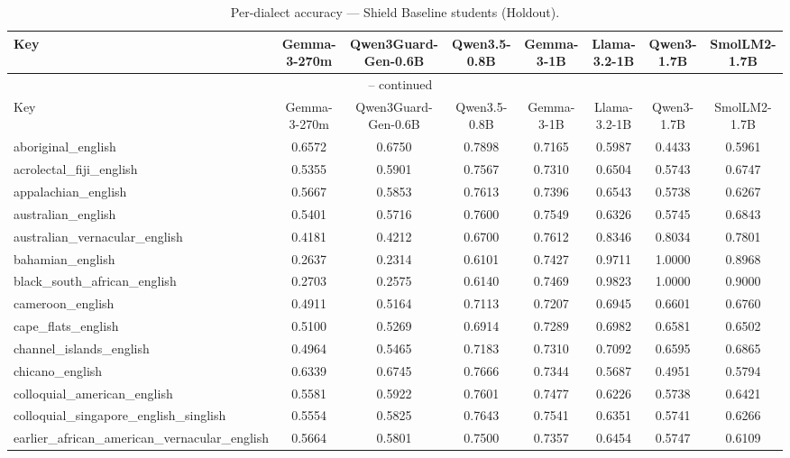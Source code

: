 \begin{landscape}
\begin{longtable}{lccccccc}
\caption{Per-dialect accuracy — Shield Baseline students (Holdout).} \\
\label{tab:students_baseline_per_dialect_holdout}
\toprule
Key & Gemma-3-270m & Qwen3Guard-Gen-0.6B & Qwen3.5-0.8B & Gemma-3-1B & Llama-3.2-1B & Qwen3-1.7B & SmolLM2-1.7B \\
\midrule
\endfirsthead
\multicolumn{8}{c}{\tablename\ \thetable{} -- continued} \\
\toprule
Key & Gemma-3-270m & Qwen3Guard-Gen-0.6B & Qwen3.5-0.8B & Gemma-3-1B & Llama-3.2-1B & Qwen3-1.7B & SmolLM2-1.7B \\
\midrule
\endhead
aboriginal\_english & 0.6572 & 0.6750 & 0.7898 & 0.7165 & 0.5987 & 0.4433 & 0.5961 \\
acrolectal\_fiji\_english & 0.5355 & 0.5901 & 0.7567 & 0.7310 & 0.6504 & 0.5743 & 0.6747 \\
appalachian\_english & 0.5667 & 0.5853 & 0.7613 & 0.7396 & 0.6543 & 0.5738 & 0.6267 \\
australian\_english & 0.5401 & 0.5716 & 0.7600 & 0.7549 & 0.6326 & 0.5745 & 0.6843 \\
australian\_vernacular\_english & 0.4181 & 0.4212 & 0.6700 & 0.7612 & 0.8346 & 0.8034 & 0.7801 \\
bahamian\_english & 0.2637 & 0.2314 & 0.6101 & 0.7427 & 0.9711 & 1.0000 & 0.8968 \\
black\_south\_african\_english & 0.2703 & 0.2575 & 0.6140 & 0.7469 & 0.9823 & 1.0000 & 0.9000 \\
cameroon\_english & 0.4911 & 0.5164 & 0.7113 & 0.7207 & 0.6945 & 0.6601 & 0.6760 \\
cape\_flats\_english & 0.5100 & 0.5269 & 0.6914 & 0.7289 & 0.6982 & 0.6581 & 0.6502 \\
channel\_islands\_english & 0.4964 & 0.5465 & 0.7183 & 0.7310 & 0.7092 & 0.6595 & 0.6865 \\
chicano\_english & 0.6339 & 0.6745 & 0.7666 & 0.7344 & 0.5687 & 0.4951 & 0.5794 \\
colloquial\_american\_english & 0.5581 & 0.5922 & 0.7601 & 0.7477 & 0.6226 & 0.5738 & 0.6421 \\
colloquial\_singapore\_english\_singlish & 0.5554 & 0.5825 & 0.7643 & 0.7541 & 0.6351 & 0.5741 & 0.6266 \\
earlier\_african\_american\_vernacular\_english & 0.5664 & 0.5801 & 0.7500 & 0.7357 & 0.6454 & 0.5747 & 0.6109 \\

\end{longtable}
\end{landscape}
